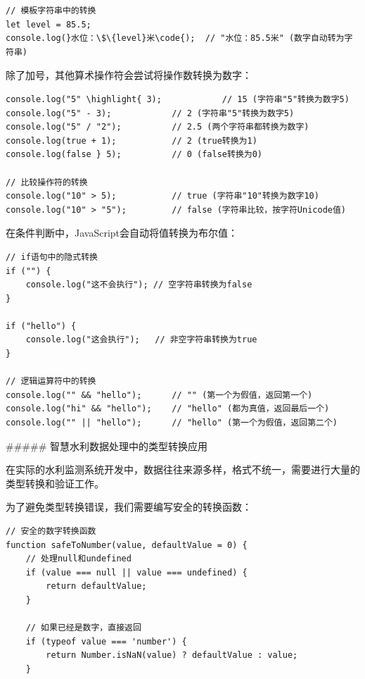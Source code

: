 {\begin{lstlisting}[style=javascript]
// 模板字符串中的转换
let level = 85.5;
console.log(}水位：\$\{level}米\code{);  // "水位：85.5米" (数字自动转为字符串)
\end{lstlisting}


除了加号，其他算术操作符会尝试将操作数转换为数字：

\begin{lstlisting}[style=javascript]
console.log("5" \highlight{ 3);            // 15 (字符串"5"转换为数字5)
console.log("5" - 3);            // 2 (字符串"5"转换为数字5)
console.log("5" / "2");          // 2.5 (两个字符串都转换为数字)
console.log(true + 1);           // 2 (true转换为1)
console.log(false } 5);          // 0 (false转换为0)

// 比较操作符的转换
console.log("10" > 5);           // true (字符串"10"转换为数字10)
console.log("10" > "5");         // false (字符串比较，按字符Unicode值)
\end{lstlisting}


在条件判断中，JavaScript会自动将值转换为布尔值：

\begin{lstlisting}[style=javascript]
// if语句中的隐式转换
if ("") {
    console.log("这不会执行"); // 空字符串转换为false
}

if ("hello") {
    console.log("这会执行");   // 非空字符串转换为true
}

// 逻辑运算符中的转换
console.log("" && "hello");      // "" (第一个为假值，返回第一个)
console.log("hi" && "hello");    // "hello" (都为真值，返回最后一个)
console.log("" || "hello");      // "hello" (第一个为假值，返回第二个)
\end{lstlisting}

##### 智慧水利数据处理中的类型转换应用

在实际的水利监测系统开发中，数据往往来源多样，格式不统一，需要进行大量的类型转换和验证工作。


为了避免类型转换错误，我们需要编写安全的转换函数：

\begin{lstlisting}[style=javascript]
// 安全的数字转换函数
function safeToNumber(value, defaultValue = 0) {
    // 处理null和undefined
    if (value === null || value === undefined) {
        return defaultValue;
    }
    
    // 如果已经是数字，直接返回
    if (typeof value === 'number') {
        return Number.isNaN(value) ? defaultValue : value;
    }
    

\end{lstlisting}}
